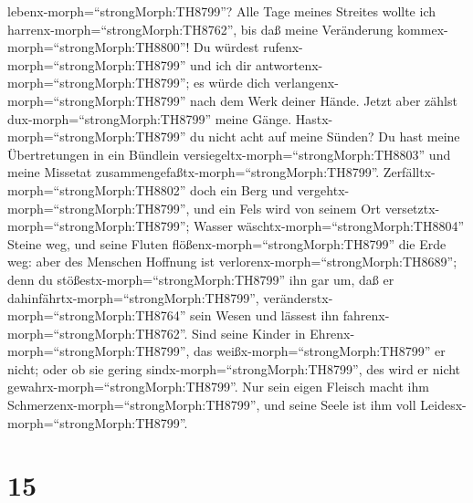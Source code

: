 lebenx-morph=``strongMorph:TH8799''? Alle Tage meines Streites wollte
ich harrenx-morph=``strongMorph:TH8762'', bis daß meine Veränderung
kommex-morph=``strongMorph:TH8800''!  Du würdest
rufenx-morph=``strongMorph:TH8799'' und ich dir
antwortenx-morph=``strongMorph:TH8799''; es würde dich
verlangenx-morph=``strongMorph:TH8799'' nach dem Werk deiner Hände.
 Jetzt aber zählst dux-morph=``strongMorph:TH8799'' meine
Gänge. Hastx-morph=``strongMorph:TH8799'' du nicht acht auf meine
Sünden?  Du hast meine Übertretungen in ein Bündlein
versiegeltx-morph=``strongMorph:TH8803'' und meine Missetat
zusammengefaßtx-morph=``strongMorph:TH8799''. 
Zerfälltx-morph=``strongMorph:TH8802'' doch ein Berg und
vergehtx-morph=``strongMorph:TH8799'', und ein Fels wird von seinem Ort
versetztx-morph=``strongMorph:TH8799'';  Wasser
wäschtx-morph=``strongMorph:TH8804'' Steine weg, und seine Fluten
flößenx-morph=``strongMorph:TH8799'' die Erde weg: aber des Menschen
Hoffnung ist verlorenx-morph=``strongMorph:TH8689'';  denn
du stößestx-morph=``strongMorph:TH8799'' ihn gar um, daß er
dahinfährtx-morph=``strongMorph:TH8799'',
veränderstx-morph=``strongMorph:TH8764'' sein Wesen und lässest ihn
fahrenx-morph=``strongMorph:TH8762''.  Sind seine Kinder in
Ehrenx-morph=``strongMorph:TH8799'', das
weißx-morph=``strongMorph:TH8799'' er nicht; oder ob sie gering
sindx-morph=``strongMorph:TH8799'', des wird er nicht
gewahrx-morph=``strongMorph:TH8799''.  Nur sein eigen
Fleisch macht ihm Schmerzenx-morph=``strongMorph:TH8799'', und seine
Seele ist ihm voll Leidesx-morph=``strongMorph:TH8799''.

\hypertarget{section-14}{%
\section{15}\label{section-14}}

